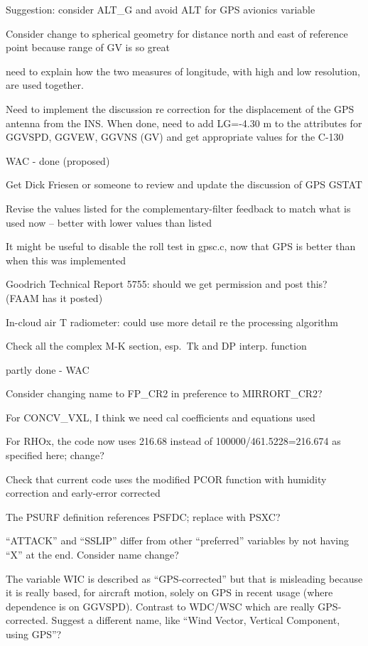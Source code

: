 \documentclass[
  english,
]{book}
\begin{document}
Suggestion: consider ALT\_G and avoid ALT for GPS avionics variable

Consider change to spherical geometry for distance north and east of reference point because range of GV is so great

need to explain how the two measures of longitude, with high and low resolution, are used together.

Need to implement the discussion re correction for the displacement of the GPS antenna from the INS. When done, need to add LG=-4.30 m to the attributes for GGVSPD, GGVEW, GGVNS (GV) and get appropriate values for the C-130

WAC - done (proposed)

Get Dick Friesen or someone to review and update the discussion of GPS GSTAT

Revise the values listed for the complementary-filter feedback to match what is used now -- better with lower values than listed

It might be useful to disable the roll test in gpsc.c, now that GPS is better than when this was implemented

Goodrich Technical Report 5755: should we get permission and post this? (FAAM has it posted)

In-cloud air T radiometer: could use more detail re the processing algorithm

Check all the complex M-K section, esp.~{Tk} and DP interp. function

partly done - WAC

Consider changing name to FP\_CR2 in preference to MIRRORT\_CR2?

For CONCV\_VXL, I think we need cal coefficients and equations used

For RHOx, the code now uses 216.68 instead of 100000/461.5228=216.674 as specified here; change?

Check that current code uses the modified PCOR function with humidity correction and early-error corrected

The PSURF definition references PSFDC; replace with PSXC?

``ATTACK'' and ``SSLIP'' differ from other ``preferred'' variables by not having ``X'' at the end. Consider name change?

The variable WIC is described as ``GPS-corrected'' but that is misleading because it is really based, for aircraft motion, solely on GPS in recent usage (where dependence is on GGVSPD). Contrast to WDC/WSC which are really GPS-corrected. Suggest a different name, like ``Wind Vector, Vertical Component, using GPS''?
\end{document}
